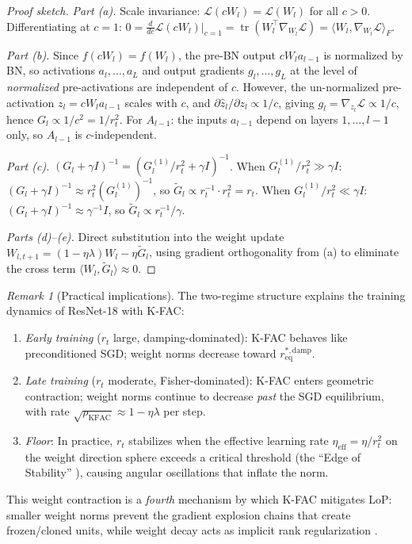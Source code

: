 \documentclass{article}
\DeclareMathOperator{\tr}{tr}
\theoremstyle{plain}
\theoremstyle{definition}
\theoremstyle{remark}
\newtheorem{remark}{Remark}
\begin{document}
\begin{proof}[Proof sketch]
\emph{Part (a).} Scale invariance: $\mathcal{L}(cW_l) = \mathcal{L}(W_l)$ for all $c > 0$. Differentiating at $c = 1$: $0 = \frac{d}{dc}\mathcal{L}(cW_l)\big|_{c=1} = \tr(W_l^\top\nabla_{W_l}\mathcal{L}) = \langle W_l, \nabla_{W_l}\mathcal{L}\rangle_F$.

\emph{Part (b).} Since $f(cW_l) = f(W_l)$, the pre-BN output $cW_l a_{l-1}$ is normalized by BN, so activations $a_l, \ldots, a_L$ and output gradients $g_l, \ldots, g_L$ at the level of \emph{normalized} pre-activations are independent of $c$. However, the un-normalized pre-activation $z_l = cW_l a_{l-1}$ scales with $c$, and $\partial\hat{z}_l/\partial z_l \propto 1/c$, giving $g_l = \nabla_{z_l}\mathcal{L} \propto 1/c$, hence $G_l \propto 1/c^2 = 1/r_t^2$. For $A_{l-1}$: the inputs $a_{l-1}$ depend on layers $1, \ldots, l{-}1$ only, so $A_{l-1}$ is $c$-independent.

\emph{Part (c).} $(G_l + \gamma I)^{-1} = (G_l^{(1)}/r_t^2 + \gamma I)^{-1}$. When $G_l^{(1)}/r_t^2 \gg \gamma I$: $(G_l+\gamma I)^{-1} \approx r_t^2(G_l^{(1)})^{-1}$, so $\tilde{G}_l \propto r_t^{-1} \cdot r_t^2 = r_t$. When $G_l^{(1)}/r_t^2 \ll \gamma I$: $(G_l+\gamma I)^{-1} \approx \gamma^{-1}I$, so $\tilde{G}_l \propto r_t^{-1}/\gamma$.

\emph{Parts (d)--(e).} Direct substitution into the weight update $W_{l,t+1} = (1-\eta\lambda)W_l - \eta\tilde{G}_l$, using gradient orthogonality from (a) to eliminate the cross term $\langle W_l, \tilde{G}_l\rangle \approx 0$.
\end{proof}

\begin{remark}[Practical implications]
\label{rem:weight_contraction}
The two-regime structure explains the training dynamics of ResNet-18 with K-FAC:
\begin{enumerate}
    \item \emph{Early training} ($r_t$ large, damping-dominated): K-FAC behaves like preconditioned SGD; weight norms decrease toward $r_{\mathrm{eq}}^{*,\mathrm{damp}}$.
    \item \emph{Late training} ($r_t$ moderate, Fisher-dominated): K-FAC enters geometric contraction; weight norms continue to decrease \emph{past} the SGD equilibrium, with rate $\sqrt{\rho_{\mathrm{KFAC}}} \approx 1 - \eta\lambda$ per step.
    \item \emph{Floor}: In practice, $r_t$ stabilizes when the effective learning rate $\eta_{\mathrm{eff}} = \eta/r_t^2$ on the weight direction sphere exceeds a critical threshold (the ``Edge of Stability'' \citep{cohen2021gradient, kosson2024rotational}), causing angular oscillations that inflate the norm.
\end{enumerate}
This weight contraction is a \emph{fourth} mechanism by which K-FAC mitigates LoP: smaller weight norms prevent the gradient explosion chains that create frozen/cloned units, while weight decay acts as implicit rank regularization \citep{wu2026rank}.
\end{remark}
\end{document}
